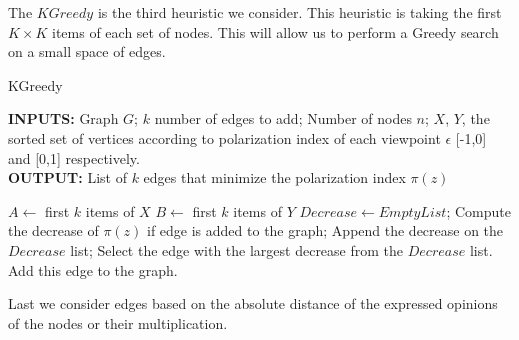\vspace{10pt}
\clearpage

\noindent The $KGreedy$ is the third heuristic we consider. This heuristic is taking the first $K \times K$ items of each set of nodes. This will allow us to perform a Greedy search on a small space of edges.

\begin{algorithm}[htbp]
	\caption{KGreedy}
	\label{alg:kgreedy}
	
	\begin{flushleft}
        		\textbf{INPUTS:} Graph $G$; $k$ number of edges to add; Number of nodes $n$;
		$X$, $Y $, the sorted set of vertices according to polarization index of each viewpoint $\epsilon$ [-1,0] and [0,1] respectively.\\
		\vspace{6pt}
        		\textbf{OUTPUT:} List of $k$ edges that minimize the polarization index $\pi(z)$
	\end{flushleft}
	
	\begin{algorithmic}[1]
		\STATE $A \leftarrow $ first $k$ items of $X$
		\STATE $B \leftarrow $ first $k$ items of $Y$
			\STATE$Decrease \leftarrow Empty List$;
				\STATE Compute the decrease of $\pi(z)$ if edge is added to the graph;
				\STATE Append the decrease on the $Decrease$ list;
			\ENDFOR
			\STATE Select the edge with the largest decrease from the $Decrease$ list.
			\STATE Add this edge to the graph.
		\ENDFOR
	\end{algorithmic}
	
\end{algorithm}
		
\clearpage

\noindent Last we consider edges based on the absolute distance of the expressed opinions of the nodes or their multiplication.

